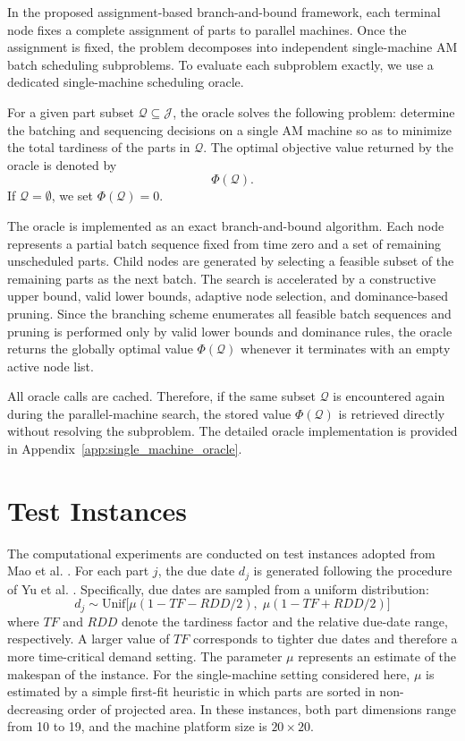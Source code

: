 \documentclass[letterpaper, 10 pt, conference]{ieeeconf}  %
\begin{document}
In the proposed assignment-based branch-and-bound framework, each terminal
node fixes a complete assignment of parts to parallel machines. Once the
assignment is fixed, the problem decomposes into independent single-machine
AM batch scheduling subproblems. To evaluate each subproblem exactly, we use
a dedicated single-machine scheduling oracle.

For a given part subset $\mathcal{Q}\subseteq\mathcal{J}$, the oracle solves
the following problem: determine the batching and sequencing decisions on a
single AM machine so as to minimize the total tardiness of the parts in
$\mathcal{Q}$. The optimal objective value returned by the oracle is denoted
by
\[
\Phi(\mathcal{Q}).
\]
If $\mathcal{Q}=\emptyset$, we set $\Phi(\mathcal{Q})=0$.

The oracle is implemented as an exact branch-and-bound algorithm. Each node
represents a partial batch sequence fixed from time zero and a set of
remaining unscheduled parts. Child nodes are generated by selecting a
feasible subset of the remaining parts as the next batch. The search is
accelerated by a constructive upper bound, valid lower bounds, adaptive node
selection, and dominance-based pruning. Since the branching scheme enumerates
all feasible batch sequences and pruning is performed only by valid lower
bounds and dominance rules, the oracle returns the globally optimal value
$\Phi(\mathcal{Q})$ whenever it terminates with an empty active node list.

All oracle calls are cached. Therefore, if the same subset $\mathcal{Q}$ is
encountered again during the parallel-machine search, the stored value
$\Phi(\mathcal{Q})$ is retrieved directly without resolving the subproblem.
The detailed oracle implementation is provided in
Appendix~\ref{app:single_machine_oracle}.

\section{Test Instances}
The computational experiments are conducted on test instances adopted from Mao et al. \cite{maoCombinatorialBendersDecomposition2024}. For each part $j$, the due date $d_j$ is generated following the procedure of Yu et al. \cite{yuMathematicalModelsMinimizing2022}. Specifically, due dates are sampled from a uniform distribution:
\begin{equation}
    d_j \sim \text{Unif} \big[ \mu(1 - TF - RDD/2), \; \mu(1 - TF + RDD/2) \big]
\end{equation}
where $TF$ and $RDD$ denote the tardiness factor and the relative due-date range, respectively. A larger value of $TF$ corresponds to tighter due dates and therefore a more time-critical demand setting. The parameter $\mu$ represents an estimate of the makespan of the instance. For the single-machine setting considered here, $\mu$ is estimated by a simple first-fit heuristic in which parts are sorted in non-decreasing order of projected area. In these instances, both part dimensions range from 10 to 19, and the machine platform size is $20 \times 20$.
\end{document}
